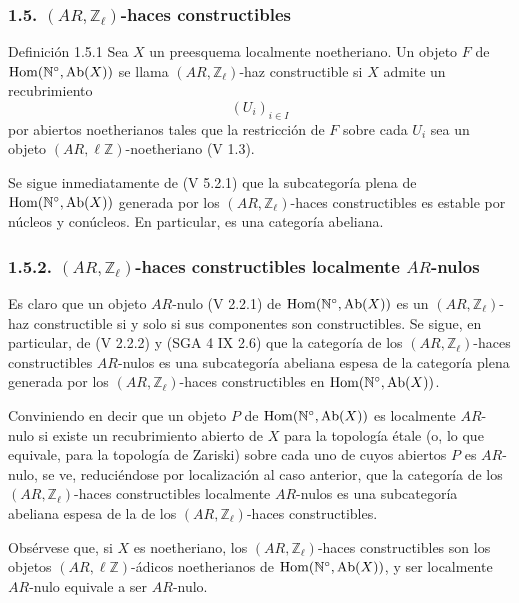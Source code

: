 \subsubsection*{1.5. \((AR,\mathbb Z_\ell)\)-haces constructibles}

\begin{statement}{Definición 1.5.1}
Sea \(X\) un preesquema localmente noetheriano. Un objeto \(F\) de \(\operatorname{Hom}(\mathbb N^\circ,\operatorname{Ab}(X))\) se llama \((AR,\mathbb Z_\ell)\)-haz constructible si \(X\) admite un recubrimiento
\[
(U_i)_{i\in I}
\]
por abiertos noetherianos tales que la restricción de \(F\) sobre cada \(U_i\) sea un objeto \((AR,\ell\mathbb Z)\)-noetheriano (V 1.3).
\end{statement}

Se sigue inmediatamente de (V 5.2.1) que la subcategoría plena de \(\operatorname{Hom}(\mathbb N^\circ,\operatorname{Ab}(X))\) generada por los \((AR,\mathbb Z_\ell)\)-haces constructibles es estable por núcleos y conúcleos. En particular, es una categoría abeliana.

\subsubsection*{1.5.2. \((AR,\mathbb Z_\ell)\)-haces constructibles localmente \(AR\)-nulos}

Es claro que un objeto \(AR\)-nulo (V 2.2.1) de \(\operatorname{Hom}(\mathbb N^\circ,\operatorname{Ab}(X))\) es un \((AR,\mathbb Z_\ell)\)-haz constructible si y solo si sus componentes son constructibles. Se sigue, en particular, de (V 2.2.2) y (SGA 4 IX 2.6) que la categoría de los \((AR,\mathbb Z_\ell)\)-haces constructibles \(AR\)-nulos es una subcategoría abeliana espesa de la categoría plena generada por los \((AR,\mathbb Z_\ell)\)-haces constructibles en \(\operatorname{Hom}(\mathbb N^\circ,\operatorname{Ab}(X))\).

Conviniendo en decir que un objeto \(P\) de \(\operatorname{Hom}(\mathbb N^\circ,\operatorname{Ab}(X))\) es localmente \(AR\)-nulo si existe un recubrimiento abierto de \(X\) para la topología étale (o, lo que equivale, para la topología de Zariski) sobre cada uno de cuyos abiertos \(P\) es \(AR\)-nulo, se ve, reduciéndose por localización al caso anterior, que la categoría de los \((AR,\mathbb Z_\ell)\)-haces constructibles localmente \(AR\)-nulos es una subcategoría abeliana espesa de la de los \((AR,\mathbb Z_\ell)\)-haces constructibles.

Obsérvese que, si \(X\) es noetheriano, los \((AR,\mathbb Z_\ell)\)-haces constructibles son los objetos \((AR,\ell\mathbb Z)\)-ádicos noetherianos de \(\operatorname{Hom}(\mathbb N^\circ,\operatorname{Ab}(X))\), y ser localmente \(AR\)-nulo equivale a ser \(AR\)-nulo.

